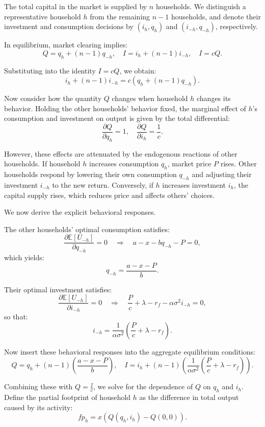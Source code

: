 \documentclass[12pt,a4paper]{article}%
\begin{document}
The total capital in the market is supplied by \( n \) households. We distinguish a representative household \( h \) from the remaining \( n - 1 \) households, and denote their investment and consumption decisions by \( (i_h, q_h) \) and \( (i_{-h}, q_{-h}) \), respectively.

In equilibrium, market clearing implies:
\[
Q = q_h + (n - 1) q_{-h}, \quad I = i_h + (n - 1) i_{-h}, \quad I = cQ.
\]

Substituting into the identity \( I = cQ \), we obtain:
\[
i_h + (n - 1) i_{-h} = c \left( q_h + (n - 1) q_{-h} \right).
\]

Now consider how the quantity \( Q \) changes when household \( h \) changes its behavior. Holding the other households' behavior fixed, the marginal effect of \( h \)'s consumption and investment on output is given by the total differential:
\[
\frac{\partial Q}{\partial q_h} = 1, \quad \frac{\partial Q}{\partial i_h} = \frac{1}{c}.
\]

However, these effects are attenuated by the endogenous reactions of other households. If household \( h \) increases consumption \( q_h \), market price \( P \) rises. Other households respond by lowering their own consumption \( q_{-h} \) and adjusting their investment \( i_{-h} \) to the new return. Conversely, if \( h \) increases investment \( i_h \), the capital supply rises, which reduces price and affects others' choices.

We now derive the explicit behavioral responses.

The other households' optimal consumption satisfies:
\[
\frac{\partial \mathbb{E}[U_{-h}]}{\partial q_{-h}} = 0 \quad \Rightarrow \quad a - x - b q_{-h} - P = 0,
\]
which yields:
\[
q_{-h} = \frac{a - x - P}{b}.
\]

Their optimal investment satisfies:
\[
\frac{\partial \mathbb{E}[U_{-h}]}{\partial i_{-h}} = 0 \quad \Rightarrow \quad \frac{P}{c} + \lambda - r_f - \alpha \sigma^2 i_{-h} = 0,
\]
so that:
\[
i_{-h} = \frac{1}{\alpha \sigma^2} \left( \frac{P}{c} + \lambda - r_f \right).
\]

Now insert these behavioral responses into the aggregate equilibrium conditions:
\[
Q = q_h + (n - 1) \left( \frac{a - x - P}{b} \right), \quad I = i_h + (n - 1) \left( \frac{1}{\alpha \sigma^2} \left( \frac{P}{c} + \lambda - r_f \right) \right).
\]

Combining these with \( Q = \frac{I}{c} \), we solve for the dependence of \( Q \) on \( q_h \) and \( i_h \). Define the partial footprint of household \( h \) as the difference in total output caused by its activity:
\[
fp_h = x \left( Q(q_h, i_h) - Q(0, 0) \right).
\]
\end{document}
